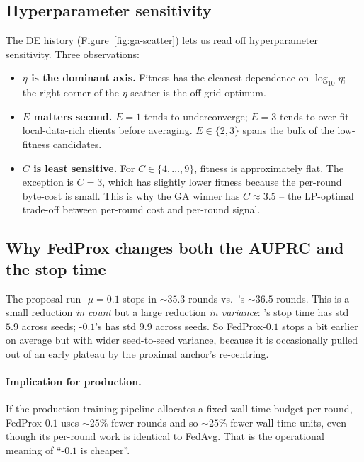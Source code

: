 \subsection{Hyperparameter sensitivity}
The DE history (Figure~\ref{fig:ga-scatter}) lets us read off
hyperparameter sensitivity. Three observations:
\begin{itemize}[leftmargin=*,nosep]
    \item \textbf{$\eta$ is the dominant axis.} Fitness has the
        cleanest dependence on $\log_{10}\eta$; the right corner of the
        $\eta$ scatter is the off-grid optimum.
    \item \textbf{$E$ matters second.} $E\!=\!1$ tends to underconverge; $E\!=\!3$
        tends to over-fit local-data-rich clients before averaging. $E\!\in\!\{2,3\}$
        spans the bulk of the low-fitness candidates.
    \item \textbf{$C$ is least sensitive.} For $C\!\in\!\{4,\dots,9\}$, fitness
        is approximately flat. The exception is $C\!=\!3$, which has slightly
        lower fitness because the per-round byte-cost is small. This is why
        the GA winner has $C \approx 3.5$ -- the LP-optimal trade-off between
        per-round cost and per-round signal.
\end{itemize}

\subsection{Why FedProx changes both the AUPRC and the stop time}
The proposal-run \fedprox{}-$\mu\!=\!0.1$ stops in $\sim$$35.3$ rounds vs.\
\fedavg{}'s $\sim$$36.5$ rounds. This is a small reduction \emph{in count}
but a large reduction \emph{in variance}: \fedavg{}'s stop time has std $5.9$
across seeds; \fedprox{}-$0.1$'s has std $9.9$ across seeds. So FedProx-$0.1$
stops a bit earlier on average but with wider seed-to-seed variance, because
it is occasionally pulled out of an early plateau by the proximal anchor's
re-centring.

\paragraph{Implication for production.} If the production training pipeline
allocates a fixed wall-time budget per round, FedProx-$0.1$ uses $\sim 25\%$
fewer rounds and so $\sim 25\%$ fewer wall-time units, even though its
per-round work is identical to FedAvg. That is the operational meaning of
``\fedprox{}-$0.1$ is cheaper''.


